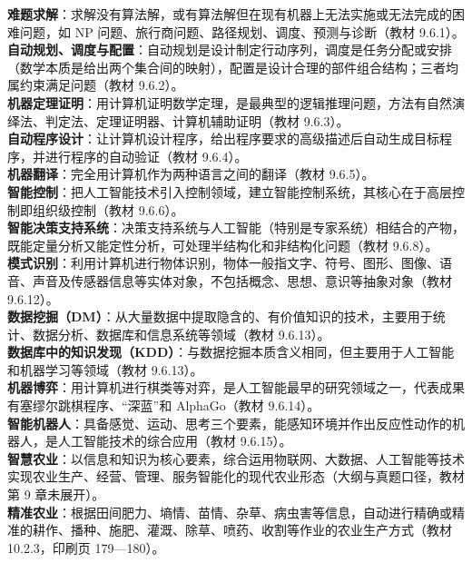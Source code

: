 \documentclass[a4paper,11pt]{article}
\begin{document}
\begin{keyterms}
\textbf{难题求解}：求解没有算法解，或有算法解但在现有机器上无法实施或无法完成的困难问题，如 NP 问题、旅行商问题、路径规划、调度、预测与诊断（教材 9.6.1）。\\
\textbf{自动规划、调度与配置}：自动规划是设计制定行动序列，调度是任务分配或安排（数学本质是给出两个集合间的映射），配置是设计合理的部件组合结构；三者均属约束满足问题（教材 9.6.2）。\\
\textbf{机器定理证明}：用计算机证明数学定理，是最典型的逻辑推理问题，方法有自然演绎法、判定法、定理证明器、计算机辅助证明（教材 9.6.3）。\\
\textbf{自动程序设计}：让计算机设计程序，给出程序要求的高级描述后自动生成目标程序，并进行程序的自动验证（教材 9.6.4）。\\
\textbf{机器翻译}：完全用计算机作为两种语言之间的翻译（教材 9.6.5）。\\
\textbf{智能控制}：把人工智能技术引入控制领域，建立智能控制系统，其核心在于高层控制即组织级控制（教材 9.6.6）。\\
\textbf{智能决策支持系统}：决策支持系统与人工智能（特别是专家系统）相结合的产物，既能定量分析又能定性分析，可处理半结构化和非结构化问题（教材 9.6.8）。\\
\textbf{模式识别}：利用计算机进行物体识别，物体一般指文字、符号、图形、图像、语音、声音及传感器信息等实体对象，不包括概念、思想、意识等抽象对象（教材 9.6.12）。\\
\textbf{数据挖掘（DM）}：从大量数据中提取隐含的、有价值知识的技术，主要用于统计、数据分析、数据库和信息系统等领域（教材 9.6.13）。\\
\textbf{数据库中的知识发现（KDD）}：与数据挖掘本质含义相同，但主要用于人工智能和机器学习等领域（教材 9.6.13）。\\
\textbf{机器博弈}：用计算机进行棋类等对弈，是人工智能最早的研究领域之一，代表成果有塞缪尔跳棋程序、“深蓝”和 AlphaGo（教材 9.6.14）。\\
\textbf{智能机器人}：具备感觉、运动、思考三个要素，能感知环境并作出反应性动作的机器人，是人工智能技术的综合应用（教材 9.6.15）。\\
\textbf{智慧农业}：以信息和知识为核心要素，综合运用物联网、大数据、人工智能等技术实现农业生产、经营、管理、服务智能化的现代农业形态（大纲与真题口径，教材第 9 章未展开）。\\
\textbf{精准农业}：根据田间肥力、墒情、苗情、杂草、病虫害等信息，自动进行精确或精准的耕作、播种、施肥、灌溉、除草、喷药、收割等作业的农业生产方式（教材 10.2.3，印刷页 179—180）。
\end{keyterms}
\end{document}
